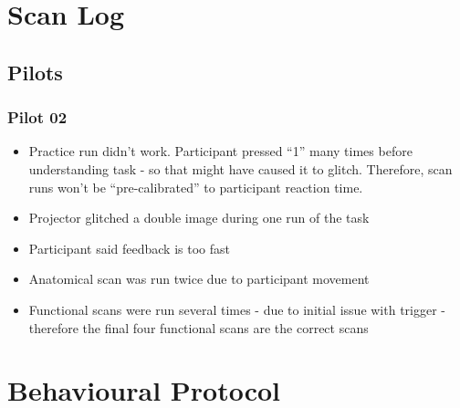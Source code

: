 \documentclass[
]{book}
\providecommand{\tightlist}{%
  \setlength{\itemsep}{0pt}\setlength{\parskip}{0pt}}
\begin{document}
\hypertarget{scan-log}{%
\chapter{Scan Log}\label{scan-log}}

\hypertarget{pilots}{%
\section{Pilots}\label{pilots}}

\hypertarget{pilot-02}{%
\subsection{Pilot 02}\label{pilot-02}}

\begin{itemize}
\tightlist
\item
  Practice run didn't work. Participant pressed ``1'' many times before understanding task - so that might have caused it to glitch. Therefore, scan runs won't be ``pre-calibrated'' to participant reaction time.
\item
  Projector glitched a double image during one run of the task
\item
  Participant said feedback is too fast
\item
  Anatomical scan was run twice due to participant movement
\item
  Functional scans were run several times - due to initial issue with trigger - therefore the final four functional scans are the correct scans
\end{itemize}

\hypertarget{behavioural-protocol}{%
\chapter{Behavioural Protocol}\label{behavioural-protocol}}

\hypertarget{section}{%
\section{}\label{section}}

  
\end{document}
